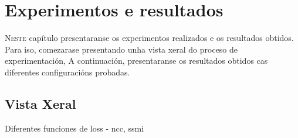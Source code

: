 \chapter{Experimentos e resultados}
\label{chap:Experimentos e resultados}
\lettrine{N}{este} capítulo presentaranse os experimentos realizados e os resultados obtidos.
Para iso, comezarase presentando unha vista xeral do proceso de experimentación, 
A continuación, presentaranse os resultados obtidos cas diferentes configuracións probadas.

\section{Vista Xeral}
\label{sec:Vista Xeral}

Diferentes funciones de loss 
    - ncc, ssmi